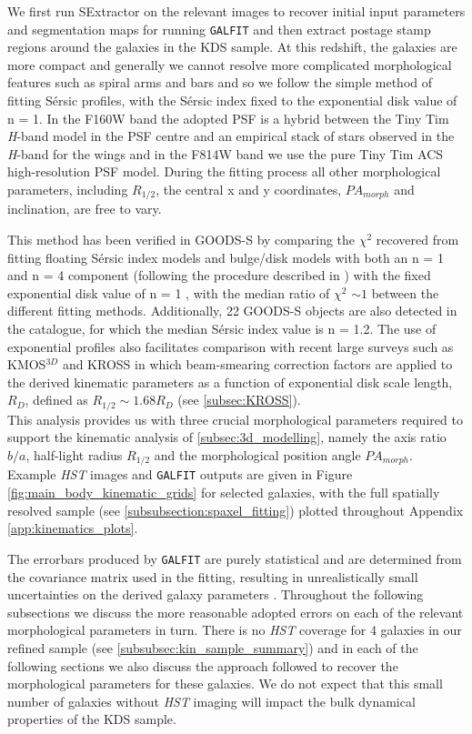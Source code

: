 \documentclass[fleqn,usenatbib]{mn2e}
\newcommand{\Sers}{S\'{e}rsic }
\begin{document}
We first run SExtractor \citep{Bertin1996} on the relevant images to recover initial input parameters and segmentation maps for running {\tt GALFIT} and then extract postage stamp regions around the galaxies in the KDS sample.
At this redshift, the galaxies are more compact and generally we cannot resolve more complicated morphological features such as spiral arms and bars and so we follow the simple method of fitting \Sers profiles, with the \Sers index fixed to the exponential disk value of n = 1.
In the F160W band the adopted PSF is a hybrid between the Tiny Tim {\it H}-band model \citep{Krist2011} in the PSF centre and an empirical stack of stars observed in the {\it H}-band for the wings \citep{VanderWel2012} and in the F814W band we use the pure Tiny Tim ACS high-resolution PSF model.
During the fitting process all other morphological parameters, including $R_{1/2}$, the central x and y coordinates, $PA_{morph}$ and inclination, are free to vary.

This method has been verified in GOODS-S by comparing the $\chi ^{2}$ recovered from fitting floating \Sers index models and bulge/disk models with both an n = 1 and n = 4 component (following the procedure described in \cite{Bruce2012}) with the fixed exponential disk value of n = 1 , with the median ratio of $\chi ^{2}$ $\sim 1$ between the different fitting methods. Additionally, 22 GOODS-S objects are also detected in the \cite{VanderWel2012} catalogue, for which the median \Sers index value is n = 1.2.
The use of exponential profiles also facilitates comparison with recent large surveys such as KMOS$^{3D}$ \citep{Wisnioski2015} and KROSS \citep{Harrison2017} in which beam-smearing correction factors are applied to the derived kinematic parameters as a function of exponential disk scale length, $R_{D}$, defined as $R_{1/2} \sim 1.68 R_{D}$ (see \cref{subsec:KROSS}). \\

This analysis provides us with three crucial morphological parameters required to support the kinematic analysis of \cref{subsec:3d_modelling}, namely the axis ratio $b/a$, half-light radius $R_{1/2}$ and the morphological position angle $PA_{morph}$.
Example {\em HST} images and {\tt GALFIT} outputs are given in Figure \ref{fig:main_body_kinematic_grids} for selected galaxies, with the full spatially resolved sample (see \cref{subsubsection:spaxel_fitting}) plotted throughout Appendix \ref{app:kinematics_plots}. 

The errorbars produced by {\tt GALFIT} are purely statistical and are determined from the covariance matrix used in the fitting, resulting in unrealistically small uncertainties on the derived galaxy parameters \citep{Hausler2007,Bruce2012}.
Throughout the following subsections we discuss the more reasonable adopted errors on each of the relevant morphological parameters in turn.
There is no {\em HST} coverage for 4 galaxies in our refined sample (see \cref{subsubsec:kin_sample_summary}) and in each of the following sections we also discuss the approach followed to recover the morphological parameters for these galaxies.
We do not expect that this small number of galaxies without {\em HST} imaging will impact the bulk dynamical properties of the KDS sample.
\end{document}
